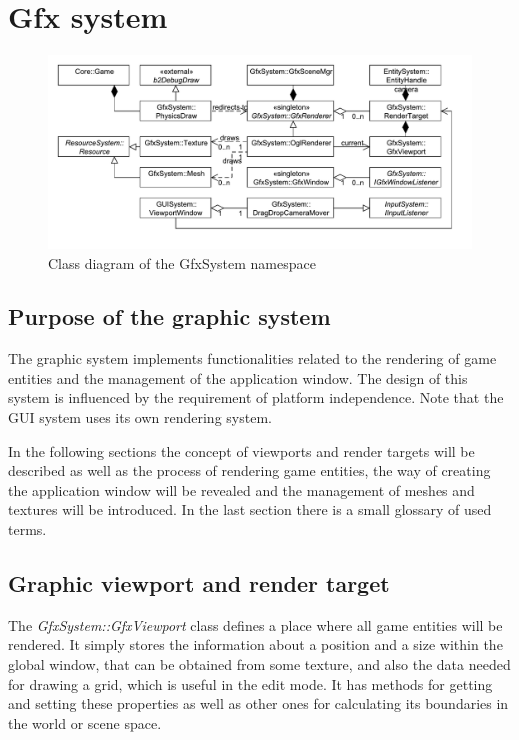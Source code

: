 \documentclass[a4paper, 12pt]{report}
\begin{document}
\chapter{Gfx system}

\begin{figure}[htbp]
	\centering
		\includegraphics[width=1\textwidth]{GfxSystemClassDiagram.pdf}
	\caption{Class diagram of the GfxSystem namespace}
	\label{fig:gfxsystem-diagram}
\end{figure}

\section{Purpose of the graphic system}

The graphic system implements functionalities related to the rendering of game entities and the management of the application window. The design of this system is influenced by the requirement of platform independence. Note that the GUI system uses its own rendering system.

In the following sections the concept of viewports and render targets will be described as well as the process of rendering game entities, the way of creating the application window will be revealed and the management of meshes and textures will be introduced. In the last section there is a small glossary of used terms.

\section{Graphic viewport and render target}
\label{sec:render-target}

The \emph{GfxSystem::GfxViewport} class defines a place where all game entities will be rendered. It simply stores the information about a position and a size within the global window, that can be obtained from some texture, and also the data needed for drawing a grid, which is useful in the edit mode. It has methods for getting and setting these properties as well as other ones for calculating its boundaries in the world or scene space.
\end{document}
